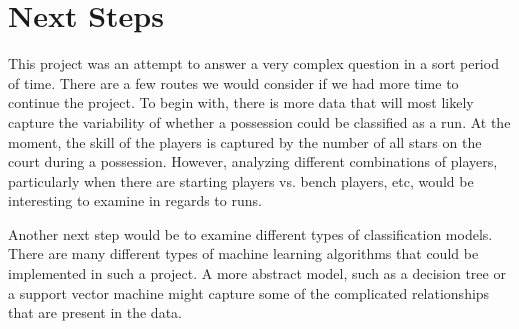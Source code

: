 \documentclass{article}
\begin{document}
\section{Next Steps}

This project was an attempt to answer a very complex question in a sort period of time. There are a few routes we would consider if we had more time to continue the project. To begin with, there is more data that will most likely capture the variability of whether a possession could be classified as a run. At the moment, the skill of the players is captured by the number of all stars on the court during a possession. However, analyzing different combinations of players, particularly when there are starting players vs. bench players, etc, would be interesting to examine in regards to runs. \newline

Another next step would be to examine different types of classification models. There are many different types of machine learning algorithms that could be implemented in such a project. A more abstract model, such as a decision tree or a support vector machine might capture some of the complicated relationships that are present in the data. 
 
\end{document}
